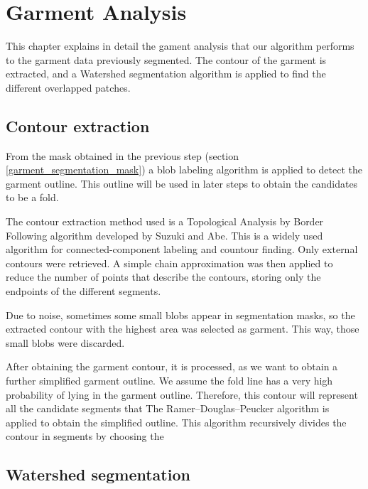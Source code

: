 \chapter{Garment Analysis}
\label{garment_analysis}

This chapter explains in detail the gament analysis that our algorithm performs to the garment data previously segmented. The contour of the garment is extracted, and a Watershed segmentation algorithm is applied to find the different overlapped patches.

\section{Contour extraction}
From the mask obtained in the previous step (section \ref{garment_segmentation_mask}) a blob labeling algorithm is applied to detect the garment outline. This outline will be used in later steps to obtain the candidates to be a fold.

The contour extraction method used is a Topological Analysis by Border Following algorithm developed by Suzuki and Abe. This is a widely used algorithm for connected-component labeling and countour finding. Only external contours were retrieved. A simple chain approximation was then applied to reduce the number of points that describe the contours, storing only the endpoints of the different segments.

Due to noise, sometimes some small blobs appear in segmentation masks, so the extracted contour with the highest area was selected as garment. This way, those small blobs were discarded.

After obtaining the garment contour, it is processed, as we want to obtain a further simplified garment outline. We assume the fold line has a very high probability of lying in the garment outline. Therefore, this contour will represent all the candidate segments that  The Ramer–Douglas–Peucker algorithm  is applied to obtain the simplified outline. This algorithm recursively divides the contour in segments by choosing the 

\section{Watershed segmentation}
